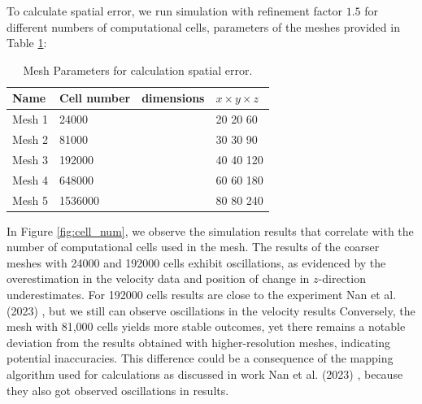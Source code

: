 To calculate spatial error, we run simulation with refinement factor $1.5$ for different numbers of computational cells, parameters of the meshes provided in Table \ref{table1-chap4}:

\begin{table}[H]
    \centering
    \caption{Mesh Parameters for calculation spatial error. } \label{table1-chap4}
    \begin{tabular}{llll}
        \toprule
        \hline
        Name     & Cell number & dimensions&$x\times y \times z $\\
        \hline
        \midrule
        Mesh 1   & 24000 && 20 20 60\\
        Mesh 2 & 81000 & &30 30 90\\
        Mesh 3 & 192000 &&40 40 120 \\
        Mesh 4 & 648000 & &60 60 180 \\
        Mesh 5 & 1536000 & &80 80 240\\
        \hline
        \bottomrule
     \end{tabular}
\end{table}

In Figure \ref{fig:cell_num}, we observe the simulation results that correlate with the number of computational cells used in the mesh. The results of the coarser meshes with 24000 and 192000 cells exhibit oscillations, as evidenced by the overestimation in the velocity data and position of change in $z$-direction underestimates. For 192000 cells results are close to the experiment Nan et al. (2023) \cite{nan2023high}, but we still can observe oscillations in the velocity results Conversely, the mesh with 81,000 cells yields more stable outcomes, yet there remains a notable deviation from the results obtained with higher-resolution meshes, indicating potential inaccuracies. This difference could be a consequence of the mapping algorithm used for calculations as discussed in work Nan et al. (2023) \cite{nan2023high}, because they also got observed oscillations in results.


